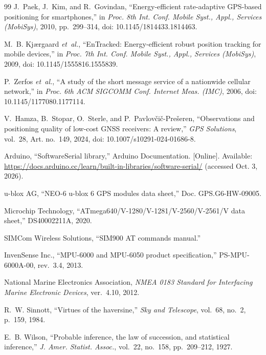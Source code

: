 \documentclass[conference]{IEEEtran}
\begin{document}
\begin{thebibliography}{99}
J.~Paek, J.~Kim, and R.~Govindan, ``Energy-efficient rate-adaptive GPS-based positioning for smartphones,'' in \emph{Proc. 8th Int. Conf. Mobile Syst., Appl., Services (MobiSys)}, 2010, pp.~299--314, doi: 10.1145/1814433.1814463.

M.~B. Kj{\ae}rgaard \emph{et~al.}, ``EnTracked: Energy-efficient robust position tracking for mobile devices,'' in \emph{Proc. 7th Int. Conf. Mobile Syst., Appl., Services (MobiSys)}, 2009, doi: 10.1145/1555816.1555839.

P.~Zerfos \emph{et~al.}, ``A study of the short message service of a nationwide cellular network,'' in \emph{Proc. 6th ACM SIGCOMM Conf. Internet Meas. (IMC)}, 2006, doi: 10.1145/1177080.1177114.

V.~Hamza, B.~Stopar, O.~Sterle, and P.~Pavlov{\v{c}}i{\v{c}}-Pre{\v{s}}eren, ``Observations and positioning quality of low-cost GNSS receivers: A review,'' \emph{GPS Solutions}, vol.~28, Art. no.~149, 2024, doi: 10.1007/s10291-024-01686-8.

Arduino, ``SoftwareSerial library,'' Arduino Documentation. [Online]. Available: \url{https://docs.arduino.cc/learn/built-in-libraries/software-serial/} (accessed Oct. 3, 2026).

u-blox AG, ``NEO-6 u-blox 6 GPS modules data sheet,'' Doc. GPS.G6-HW-09005.

Microchip Technology, ``ATmega640/V-1280/V-1281/V-2560/V-2561/V data sheet,'' DS40002211A, 2020.

SIMCom Wireless Solutions, ``SIM900 AT commands manual.''

InvenSense Inc., ``MPU-6000 and MPU-6050 product specification,'' PS-MPU-6000A-00, rev.~3.4, 2013.

National Marine Electronics Association, \emph{NMEA 0183 Standard for Interfacing Marine Electronic Devices}, ver.~4.10, 2012.

R.~W. Sinnott, ``Virtues of the haversine,'' \emph{Sky and Telescope}, vol.~68, no.~2, p.~159, 1984.

E.~B. Wilson, ``Probable inference, the law of succession, and statistical inference,'' \emph{J. Amer. Statist. Assoc.}, vol.~22, no.~158, pp.~209--212, 1927.

\end{thebibliography}
\end{document}
